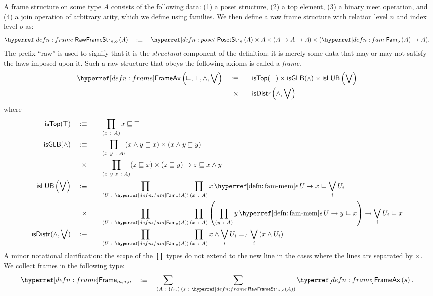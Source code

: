 \begin{defn}[Frame]\label{defn:frame}
  A frame structure on some type $A$ consists of the following data: (1) a poset
  structure, (2) a top element, (3) a binary meet operation, and (4) a join operation of
  arbitrary arity, which we define using families. We then define a raw frame structure
  with relation level $n$ and index level $o$ as:
  \begin{equation*}
    \rawframestr{n}{o}{A} \quad\is\quad \posetstr{n}{A} \times A \times (A \rightarrow A \rightarrow A) \times (\sub{o}{A} \rightarrow A).
  \end{equation*}
  The prefix ``raw'' is used to signify that it is the \emph{structural} component of the
  definition: it is merely some data that may or may not satisfy the laws imposed upon it.
  Such a raw structure that obeys the following axioms is called a \emph{frame}.
  \begin{alignat*}{2}
    \frameax{\sqsubseteq, \top, \wedge, \bigvee} \quad&\is\quad             &&\mathsf{isTop}(\top) \times
                                              \mathsf{isGLB}(\wedge) \times
                                              \mathsf{isLUB}\left( \bigvee \right)\\
                          &\hspace{0.55em}\times &&\mathsf{isDistr}\left( \wedge, \bigvee \right)
  \end{alignat*}
  where
  \begin{alignat*}{2}
    \mathsf{isTop}(\top) \quad&\is\quad &&\pity{x}{A}{x \sqsubseteq \top}\\
    \mathsf{isGLB}(\wedge) \quad&\is\quad &&\pity{x~y}{A}{(x \wedge y \sqsubseteq x) \times (x \wedge y \sqsubseteq y)}\\
                       &\hspace{0.55em}\times &&\pity{x~y~z}{A}{(z \sqsubseteq x) \times (z \sqsubseteq y) \rightarrow z \sqsubseteq x \wedge y}\\
    \mathsf{isLUB}\left(\bigvee\right) \quad&\is\quad
         &&\pity{U}{\sub{o}{A}}{\pity{x}{A}{\memfam{x}{U} \rightarrow x \sqsubseteq \bigvee_i U_i}}\\
         &\hspace{0.55em}\times &&\pity{U}{\sub{o}{A}}{\pity{x}{A}{
        \left( \pity{y}{A}{\memfam{y}{U} \rightarrow y \sqsubseteq x}\right) \rightarrow \bigvee_i U_i \sqsubseteq x }}\\
    \mathsf{isDistr}(\wedge, \bigvee) \quad&\is\quad
      &&\pity{U}{\sub{o}{A}}{\pity{x}{A}{
          x \wedge \bigvee_i U_i} =_A \bigvee_i \left( x \wedge U_i \right)
      }
  \end{alignat*}
  A minor notational clarification: the scope of the $\prod$ types do not extend to the new
  line in the cases where the lines are separated by $\times$. We collect frames in the
  following type:
  \begin{equation*}
    \framety{m}{n}{o} \quad\is\quad
      \sigmaty{A}{\univ{}_m}{
        \sigmaty{s}{\rawframestr{n}{o}{A}}{\frameax{s}}
      }.
  \end{equation*}
\end{defn}

